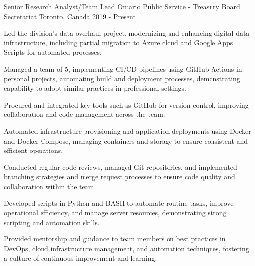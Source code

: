 

\begin{cventries}

\cventry
  {Senior Research Analyst/Team Lead}
  {Ontario Public Service - Treasury Board Secretariat}
  {Toronto, Canada}
  {2019 - Present}
  {
    \begin{cvitems}
      \item Led the division's data overhaul project, modernizing and enhancing digital data infrastructure, including partial migration to Azure cloud and Google Apps Scripts for automated processes.
      \item Managed a team of 5, implementing CI/CD pipelines using GitHub Actions in personal projects, automating build and deployment processes, demonstrating capability to adopt similar practices in professional settings.
      \item Procured and integrated key tools such as GitHub for version control, improving collaboration and code management across the team.
      \item Automated infrastructure provisioning and application deployments using Docker and Docker-Compose, managing containers and storage to ensure consistent and efficient operations.
      \item Conducted regular code reviews, managed Git repositories, and implemented branching strategies and merge request processes to ensure code quality and collaboration within the team.
      \item Developed scripts in Python and BASH to automate routine tasks, improve operational efficiency, and manage server resources, demonstrating strong scripting and automation skills.
      \item Provided mentorship and guidance to team members on best practices in DevOps, cloud infrastructure management, and automation techniques, fostering a culture of continuous improvement and learning.
    \end{cvitems}
  }


\end{cventries}
